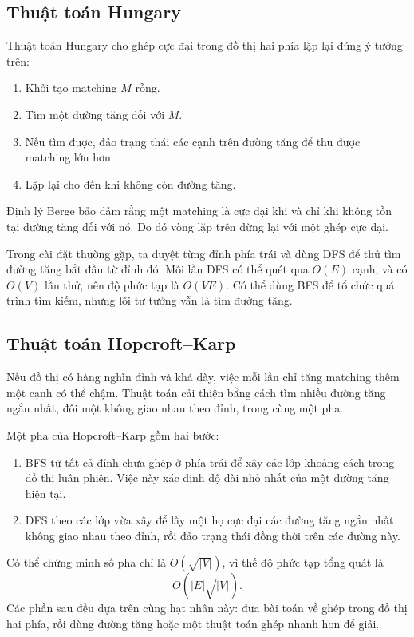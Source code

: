 \documentclass[11pt]{article}
\begin{document}
\subsection{Thuật toán Hungary}

Thuật toán Hungary cho ghép cực đại trong đồ thị hai phía lặp lại đúng ý tưởng
trên:
\begin{enumerate}
  \item Khởi tạo matching $M$ rỗng.
  \item Tìm một đường tăng đối với $M$.
  \item Nếu tìm được, đảo trạng thái các cạnh trên đường tăng để thu được
  matching lớn hơn.
  \item Lặp lại cho đến khi không còn đường tăng.
\end{enumerate}

Định lý Berge bảo đảm rằng một matching là cực đại khi và chỉ khi không tồn tại
đường tăng đối với nó. Do đó vòng lặp trên dừng lại với một ghép cực đại.

Trong cài đặt thường gặp, ta duyệt từng đỉnh phía trái và dùng DFS để thử tìm
đường tăng bắt đầu từ đỉnh đó. Mỗi lần DFS có thể quét qua $O(E)$ cạnh, và có
$O(V)$ lần thử, nên độ phức tạp là $O(VE)$. Có thể dùng BFS để tổ chức quá
trình tìm kiếm, nhưng lõi tư tưởng vẫn là tìm đường tăng.

\subsection{Thuật toán Hopcroft--Karp}

Nếu đồ thị có hàng nghìn đỉnh và khá dày, việc mỗi lần chỉ tăng matching thêm
một cạnh có thể chậm. Thuật toán  cải thiện bằng cách tìm
nhiều đường tăng ngắn nhất, đôi một không giao nhau theo đỉnh, trong cùng một
pha.

Một pha của Hopcroft--Karp gồm hai bước:
\begin{enumerate}
  \item BFS từ tất cả đỉnh chưa ghép ở phía trái để xây các lớp khoảng cách
  trong đồ thị luân phiên. Việc này xác định độ dài nhỏ nhất của một đường
  tăng hiện tại.
  \item DFS theo các lớp vừa xây để lấy một họ cực đại các đường tăng ngắn
  nhất không giao nhau theo đỉnh, rồi đảo trạng thái đồng thời trên các đường
  này.
\end{enumerate}

Có thể chứng minh số pha chỉ là $O(\sqrt{|V|})$, vì thế độ phức tạp tổng quát
là
\[
  O(|E|\sqrt{|V|}).
\]
Các phần sau đều dựa trên cùng hạt nhân này: đưa bài toán về ghép trong đồ thị
hai phía, rồi dùng đường tăng hoặc một thuật toán ghép nhanh hơn để giải.
\end{document}
